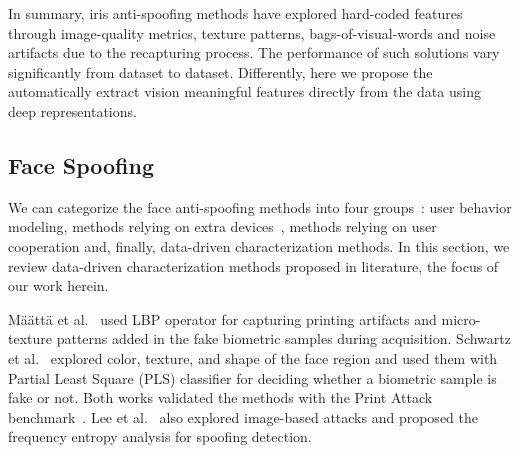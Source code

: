 
In summary, iris anti-spoofing methods have explored hard-coded features through image-quality metrics, texture patterns, bags-of-visual-words and noise artifacts due to the recapturing process. The performance of such solutions vary significantly from dataset to dataset. Differently, here we propose the automatically extract vision meaningful features directly from the data using deep representations.


\subsection{Face Spoofing}

We can categorize the face anti-spoofing methods into four groups~\cite{Schwartz:IJCB:2011}: user behavior modeling, methods relying on extra devices~\cite{Yi:2014}, methods relying on user cooperation and, finally, data-driven characterization methods. In this section, we review data-driven characterization methods proposed in literature, the focus of our work herein.

M\"{a}\"{a}tt\"{a} et al.~\cite{Maatta:IJCB:2011} used LBP operator for capturing printing artifacts and micro-texture patterns added in the fake biometric samples during acquisition. Schwartz et al.~\cite{Schwartz:IJCB:2011} explored color, texture, and shape of the face region and used them with Partial Least Square (PLS) classifier for deciding whether a biometric sample is fake or not. Both works validated the methods with the Print Attack benchmark~\cite{Anjos:IJCB:2011}. Lee et al.~\cite{Lee:ICASSP:2013} also explored image-based attacks and proposed the frequency entropy analysis for spoofing detection.


